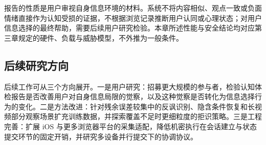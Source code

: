 报告的性质是用户审视自身信息环境的材料。系统不将内容相似、观点一致或负面情绪直接作为认知受损的证据，不根据浏览记录推断用户认同或心理状态；对用户信息选择的最终帮助，需要后续用户研究检验。本章所述性能与安全结论均对应第三章规定的硬件、负载与威胁模型，不外推为一般条件。

\subsection{后续研究方向}\label{section:5.3}

后续工作可从三个方向展开。一是用户研究：招募更大规模的参与者，检验认知体检报告是否改善用户对自身信息局限的觉察，以及这种觉察是否转化为信息选择行为的变化。二是方法改进：针对残余误差较集中的反讽识别、隐含条件恢复和长视频部分观察场景扩充训练数据，并探索覆盖不足时更细粒度的拒识策略。三是工程完善：扩展 iOS 与更多浏览器平台的采集适配，降低机密执行在会话建立与状态提交环节的固定开销，并研究多设备并行提交下的协调协议。
